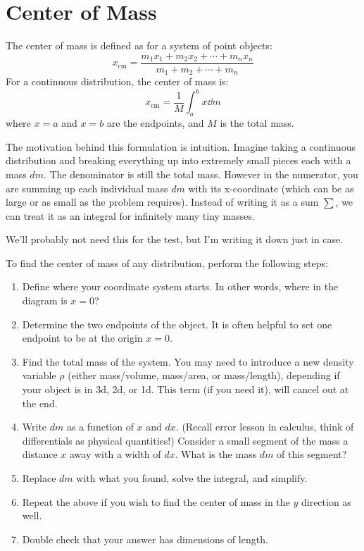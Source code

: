 \documentclass{article}
\begin{document}
\section{Center of Mass}
The center of mass is defined as for a system of point objects:
\begin{equation}
    x_\text{cm} = \frac{m_1x_1+m_2x_2+\cdots+m_nx_n}{m_1+m_2+\cdots+m_n}
\end{equation}
For a continuous distribution, the center of mass is:
\begin{equation}
    x_\text{cm} = \frac{1}{M}\int_a^b x \dd{m}
    \label{eq:}
\end{equation}
where $x=a$ and $x=b$ are the endpoints, and $M$ is the total mass.
\begin{idea}
    The motivation behind this formulation is intuition. Imagine taking a continuous distribution and breaking everything up into extremely small pieces each with a mass $dm$. The denominator is still the total mass. However in the numerator, you are summing up each individual mass $dm$ with its x-coordinate (which can be as large or as small as the problem requires). Instead of writing it as a sum $\sum$, we can treat it as an integral for infinitely many tiny masses.
\end{idea}
\begin{warning}
    We'll probably not need this for the test, but I'm writing it down just in case.
\end{warning}
To find the center of mass of any distribution, perform the following steps:
\begin{enumerate}
    \item Define where your coordinate system starts. In other words, where in the diagram is $x=0$?
    \item Determine the two endpoints of the object. It is often helpful to set one endpoint to be at the origin $x=0$.
    \item Find the total mass of the system. You may need to introduce a new density variable $\rho$ (either mass/volume, mass/area, or mass/length), depending if your object is in 3d, 2d, or 1d. This term (if you need it), will cancel out at the end.
    \item Write $dm$ as a function of $x$ and $dx$. (Recall error lesson in calculus, think of differentials as physical quantities!) Consider a small segment of the mass a distance $x$ away with a width of $dx$. What is the mass $dm$ of this segment?
    \item Replace $dm$ with what you found, solve the integral, and simplify.
    \item Repeat the above if you wish to find the center of mass in the $y$ direction as well.
    \item Double check that your answer has dimensions of length.
\end{enumerate}
\end{document}
